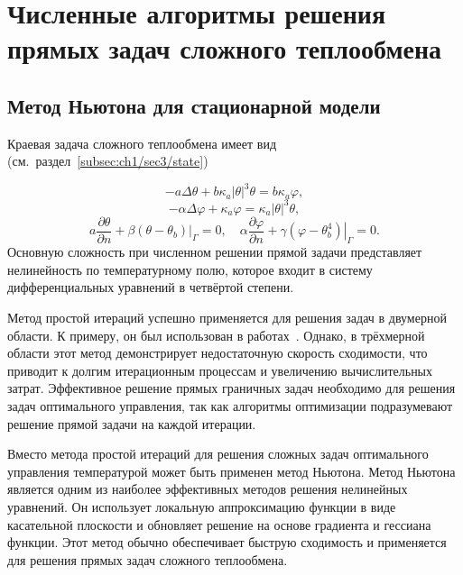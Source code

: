 \section{Численные алгоритмы решения прямых задач сложного теплообмена}
\label{sec:ch4/sec1}

\subsection{Метод Ньютона для стационарной модели}
\label{subsec:ch4/sec1/stationary}
Краевая задача сложного теплообмена
имеет вид (см.\ раздел~\ref{subsec:ch1/sec3/state})

\begin{equation}
    \label{eq:4_1:1}
        -a \Delta \theta+b \kappa_{a}| \theta|^{3} \theta =
        b \kappa_{a} \varphi,
\end{equation}
\begin{equation}
    \label{eq:4_1:2}
        -\alpha \Delta \varphi+\kappa_{a} \varphi =
        \kappa_{a}|\theta|^{3} \theta,
\end{equation}
\begin{equation}
    \label{eq:4_1:3}
        a \frac{\partial \theta}{\partial n}
        +\left.\beta\left(\theta-\theta_{b}\right)\right|_{\Gamma}=0,
        \quad \alpha \frac{\partial \varphi}{\partial n}
        +\left.\gamma\left(\varphi-\theta_{b}^{4}\right)\right|_{\Gamma}=0.
\end{equation}
Основную сложность при численном решении прямой задачи представляет нелинейность
по температурному полю, которое входит в систему
дифференциальных уравнений в четвёртой степени.

Метод простой итераций успешно применяется для решения задач в двумерной области.
К примеру, он был использован в работах~\cite{Kovtanyuk2015,astrakhantseva2014numerical}.
Однако, в трёхмерной области этот метод демонстрирует недостаточную скорость сходимости,
что приводит к долгим итерационным процессам и увеличению вычислительных затрат.
Эффективное решение прямых граничных задач необходимо для решения задач оптимального управления,
так как алгоритмы оптимизации подразумевают решение прямой задачи на каждой итерации.


Вместо метода простой итераций для решения сложных задач оптимального управления
температурой может быть применен метод Ньютона.
Метод Ньютона является одним из наиболее эффективных методов решения нелинейных уравнений.
Он использует локальную аппроксимацию функции в виде касательной плоскости
и обновляет решение на основе градиента и гессиана функции.
Этот метод обычно обеспечивает быструю сходимость и применяется
для решения прямых задач сложного теплообмена.

